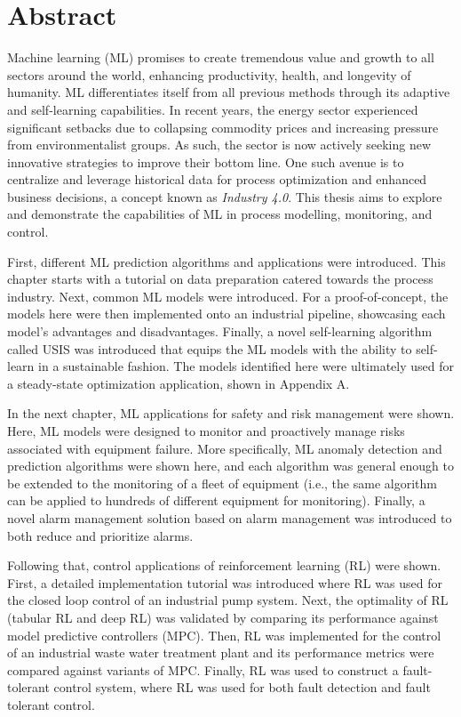 \documentclass[12pt]{report}
\begin{document}
\chapter*{Abstract}

Machine learning (ML) promises to create tremendous value and growth to all sectors around the world, enhancing productivity, health, and longevity of humanity. ML differentiates itself from all previous methods through its adaptive and self-learning capabilities. In recent years, the energy sector experienced significant setbacks due to collapsing commodity prices and increasing pressure from environmentalist groups.  As such, the sector is now actively seeking new innovative strategies to improve their bottom line.  One such avenue is to centralize and leverage historical data for process optimization and enhanced business decisions, a concept known as \textit{Industry 4.0}. This thesis aims to explore and demonstrate the capabilities of ML in process modelling, monitoring, and control.



First, different ML prediction algorithms and applications were introduced. This chapter starts with a tutorial on data preparation catered towards the process industry.  Next, common ML models were introduced.  For a proof-of-concept, the models here were then implemented onto an industrial pipeline, showcasing each model's advantages and disadvantages.  Finally, a novel self-learning algorithm called USIS was introduced that equips the ML models with the ability to self-learn in a sustainable fashion. The models identified here were ultimately used for a steady-state optimization application, shown in Appendix A.

In the next chapter, ML applications for safety and risk management were shown.  Here, ML models were designed to monitor and proactively manage risks associated with equipment failure. More specifically, ML anomaly detection and prediction algorithms were shown here, and each algorithm was general enough to be extended to the monitoring of a fleet of equipment (i.e., the same algorithm can be applied to hundreds of different equipment for monitoring). Finally, a novel alarm management solution based on alarm management was introduced to both reduce and prioritize alarms.

Following that, control applications of reinforcement learning (RL) were shown.  First, a detailed implementation tutorial was introduced where RL was used for the closed loop control of an industrial pump system. Next, the optimality of RL (tabular RL and deep RL) was validated by comparing its performance against model predictive controllers (MPC). Then, RL was implemented for the control of an industrial waste water treatment plant and its performance metrics were compared against variants of MPC. Finally, RL was used to construct a fault-tolerant control system, where RL was used for both fault detection and fault tolerant control.
\end{document}
